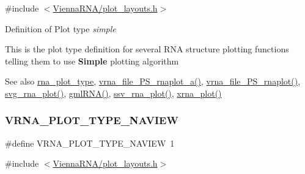 {\ttfamily \#include $<$\hyperlink{plot__layouts_8h}{Vienna\+R\+N\+A/plot\+\_\+layouts.\+h}$>$}



Definition of Plot type {\itshape simple} 

This is the plot type definition for several R\+NA structure plotting functions telling them to use {\bfseries Simple} plotting algorithm

\begin{DoxySeeAlso}{See also}
\hyperlink{group__plotting__utils_ga5964c4581431b098b80027d6e14dcdd4}{rna\+\_\+plot\+\_\+type}, \hyperlink{plot__structure_8h_a139a31dd0ba9fc6612431f67de901c31}{vrna\+\_\+file\+\_\+\+P\+S\+\_\+rnaplot\+\_\+a()}, \hyperlink{plot__structure_8h_abdc8f6548ba4a3bc3cd868ccbcfdb86a}{vrna\+\_\+file\+\_\+\+P\+S\+\_\+rnaplot()}, \hyperlink{plot__structure_8h_ae7853539b5df98f294b4af434e979304}{svg\+\_\+rna\+\_\+plot()}, \hyperlink{plot__structure_8h_a70834bc8c0aad4fe6824ff76ccb8f329}{gml\+R\+N\+A()}, \hyperlink{plot__structure_8h_add368528755f9a830727b680243541df}{ssv\+\_\+rna\+\_\+plot()}, \hyperlink{plot__structure_8h_a2f6d5953e6a323df898896b8d6614483}{xrna\+\_\+plot()} 
\end{DoxySeeAlso}
\mbox{\label{group__plotting__utils_ga94d4c863ecac2f220f76658afb92f964}} 
\subsubsection{\texorpdfstring{V\+R\+N\+A\+\_\+\+P\+L\+O\+T\+\_\+\+T\+Y\+P\+E\+\_\+\+N\+A\+V\+I\+EW}{VRNA\_PLOT\_TYPE\_NAVIEW}}
{\footnotesize\ttfamily \#define V\+R\+N\+A\+\_\+\+P\+L\+O\+T\+\_\+\+T\+Y\+P\+E\+\_\+\+N\+A\+V\+I\+EW~1}



{\ttfamily \#include $<$\hyperlink{plot__layouts_8h}{Vienna\+R\+N\+A/plot\+\_\+layouts.\+h}$>$}



